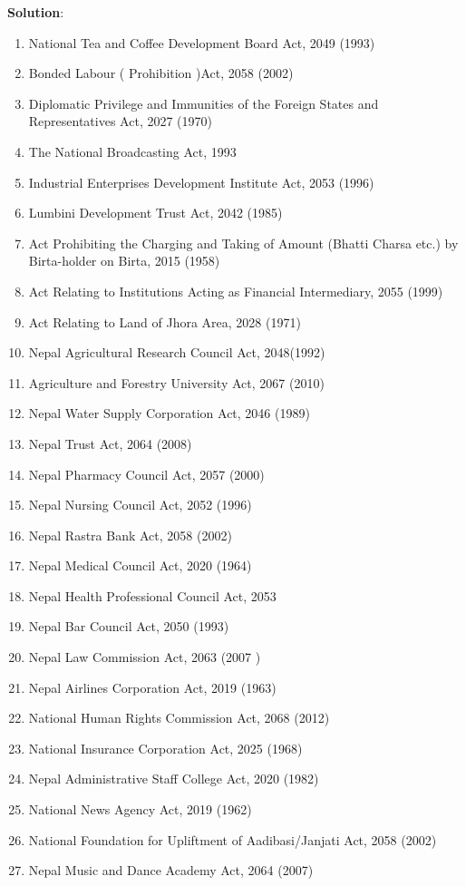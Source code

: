 \documentclass[
  openany]{book}
\newenvironment{solution}{ {\bfseries Solution}:}{}
\begin{document}
\begin{questions}
\begin{solution}
\begin{enumerate}
\item National Tea and Coffee Development Board Act, 2049 (1993)
\item Bonded Labour ( Prohibition )Act, 2058 (2002)
\item Diplomatic Privilege and Immunities of the Foreign States and Representatives Act, 2027 (1970)
\item The National Broadcasting Act, 1993
\item Industrial Enterprises Development Institute Act, 2053 (1996)
\item Lumbini Development Trust Act, 2042 (1985)
\item Act Prohibiting the Charging and Taking of Amount (Bhatti Charsa etc.) by Birta-holder on Birta, 2015 (1958)
\item Act Relating to Institutions Acting as Financial Intermediary, 2055 (1999)
\item Act Relating to Land of Jhora Area, 2028 (1971)
\item Nepal Agricultural Research Council Act, 2048(1992)
\item Agriculture and Forestry University Act, 2067 (2010)
\item Nepal Water Supply Corporation Act, 2046 (1989)
\item Nepal Trust Act, 2064 (2008)
\item Nepal Pharmacy Council Act, 2057 (2000)
\item Nepal Nursing Council Act, 2052 (1996)
\item Nepal Rastra Bank Act, 2058 (2002)
\item Nepal Medical Council Act, 2020 (1964)
\item Nepal Health Professional Council Act, 2053
\item Nepal Bar Council Act, 2050 (1993)
\item Nepal Law Commission Act, 2063 (2007 )
\item Nepal Airlines Corporation Act, 2019 (1963)
\item National Human Rights Commission Act, 2068 (2012)
\item National Insurance Corporation Act, 2025 (1968)
\item Nepal Administrative Staff College Act, 2020 (1982)
\item National News Agency Act, 2019 (1962)
\item National Foundation for Upliftment of Aadibasi/Janjati Act, 2058 (2002)
\item Nepal Music and Dance Academy Act, 2064 (2007)

\end{enumerate}
\end{solution}
\end{questions}
\end{document}
